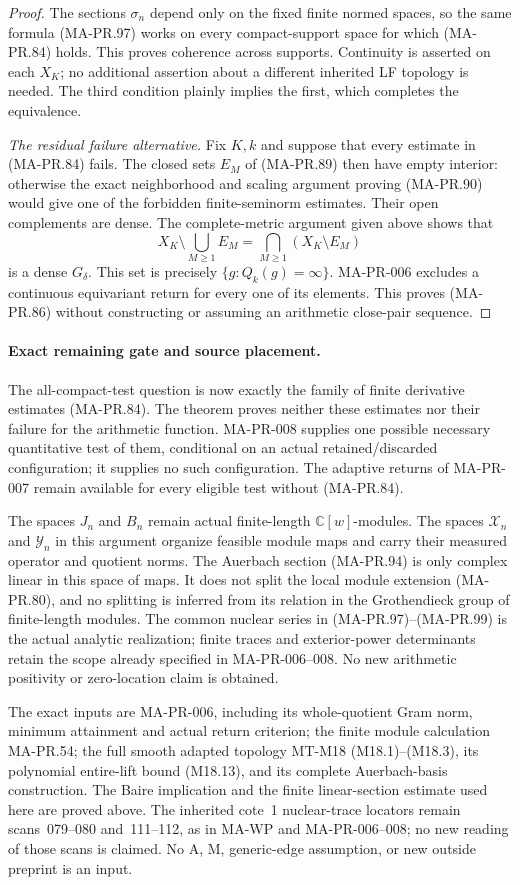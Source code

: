 \begin{proof}
The sections \(\sigma_n\) depend only on the fixed
finite normed spaces, so the same formula (MA-PR.97)
works on every compact-support space for which
(MA-PR.84) holds.  This proves coherence across
supports.  Continuity is asserted on each \(X_K\);
no additional assertion about a different inherited
LF topology is needed.
The third condition plainly implies the first,
which completes the equivalence.

\emph{The residual failure alternative.}
Fix \(K,k\) and suppose that every estimate in
(MA-PR.84) fails.
The closed sets \(E_M\) of (MA-PR.89) then have
empty interior: otherwise the exact neighborhood
and scaling argument proving (MA-PR.90) would
give one of the forbidden finite-seminorm estimates.
Their open complements are dense.
The complete-metric argument given above shows
that
\[
       X_K\setminus\bigcup_{M\ge1}E_M
          =\bigcap_{M\ge1}(X_K\setminus E_M)
\]
is a dense \(G_\delta\).  This set is precisely
\(\{g:Q_k(g)=\infty\}\).
MA-PR-006 excludes a continuous equivariant return
for every one of its elements.  This proves
(MA-PR.86) without constructing or assuming
an arithmetic close-pair sequence.
\end{proof}

\paragraph{Exact remaining gate and source placement.}
The all-compact-test question is now exactly the
family of finite derivative estimates (MA-PR.84).
The theorem proves neither these estimates nor
their failure for the arithmetic function.
MA-PR-008 supplies one possible necessary quantitative
test of them, conditional on an actual retained/discarded
configuration; it supplies no such configuration.
The adaptive returns of MA-PR-007 remain available
for every eligible test without (MA-PR.84).

The spaces \(J_n\) and \(B_n\) remain actual
finite-length \(\mathbb C[w]\)-modules.
The spaces \(\mathcal X_n\) and \(\mathcal Y_n\)
in this argument organize feasible module maps
and carry their measured operator and quotient norms.
The Auerbach section (MA-PR.94) is only complex linear
in this space of maps.  It does not split the local
module extension (MA-PR.80), and no splitting is
inferred from its relation in the Grothendieck group
of finite-length modules.
The common nuclear series in (MA-PR.97)--(MA-PR.99)
is the actual analytic realization; finite traces
and exterior-power determinants retain the scope
already specified in MA-PR-006--008.
No new arithmetic positivity or zero-location claim
is obtained.

The exact inputs are MA-PR-006, including its
whole-quotient Gram norm, minimum attainment and
actual return criterion; the finite module calculation
MA-PR.54; the full smooth adapted topology
MT-M18 (M18.1)--(M18.3), its polynomial entire-lift
bound (M18.13), and its complete Auerbach-basis
construction.  The Baire implication and the
finite linear-section estimate used here are proved
above.  The inherited cote~1 nuclear-trace locators
remain scans~079--080 and~111--112, as in MA-WP
and MA-PR-006--008; no new reading of those scans
is claimed.  No A, M, generic-edge assumption,
or new outside preprint is an input.
